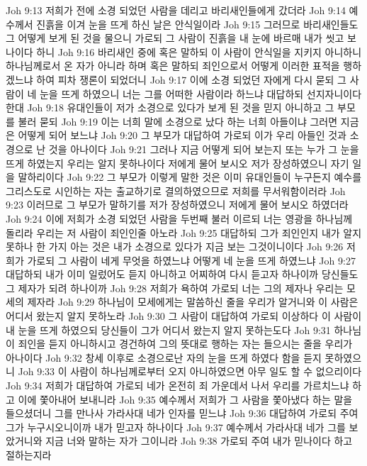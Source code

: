 Joh 9:13  저희가 전에 소경 되었던 사람을 데리고 바리새인들에게 갔더라
Joh 9:14  예수께서 진흙을 이겨 눈을 뜨게 하신 날은 안식일이라
Joh 9:15  그러므로 바리새인들도 그 어떻게 보게 된 것을 물으니 가로되 그 사람이 진흙을 내 눈에 바르매 내가 씻고 보나이다 하니
Joh 9:16  바리새인 중에 혹은 말하되 이 사람이 안식일을 지키지 아니하니 하나님께로서 온 자가 아니라 하며 혹은 말하되 죄인으로서 어떻게 이러한 표적을 행하겠느냐 하여 피차 쟁론이 되었더니
Joh 9:17  이에 소경 되었던 자에게 다시 묻되 그 사람이 네 눈을 뜨게 하였으니 너는 그를 어떠한 사람이라 하느냐 대답하되 선지자니이다 한대
Joh 9:18  유대인들이 저가 소경으로 있다가 보게 된 것을 믿지 아니하고 그 부모를 불러 묻되
Joh 9:19  이는 너희 말에 소경으로 났다 하는 너희 아들이냐 그러면 지금은 어떻게 되어 보느냐
Joh 9:20  그 부모가 대답하여 가로되 이가 우리 아들인 것과 소경으로 난 것을 아나이다
Joh 9:21  그러나 지금 어떻게 되어 보는지 또는 누가 그 눈을 뜨게 하였는지 우리는 알지 못하나이다 저에게 물어 보시오 저가 장성하였으니 자기 일을 말하리이다
Joh 9:22  그 부모가 이렇게 말한 것은 이미 유대인들이 누구든지 예수를 그리스도로 시인하는 자는 출교하기로 결의하였으므로 저희를 무서워함이러라
Joh 9:23  이러므로 그 부모가 말하기를 저가 장성하였으니 저에게 물어 보시오 하였더라
Joh 9:24  이에 저희가 소경 되었던 사람을 두번째 불러 이르되 너는 영광을 하나님께 돌리라 우리는 저 사람이 죄인인줄 아노라
Joh 9:25  대답하되 그가 죄인인지 내가 알지 못하나 한 가지 아는 것은 내가 소경으로 있다가 지금 보는 그것이니이다
Joh 9:26  저희가 가로되 그 사람이 네게 무엇을 하였느냐 어떻게 네 눈을 뜨게 하였느냐
Joh 9:27  대답하되 내가 이미 일렀어도 듣지 아니하고 어찌하여 다시 듣고자 하나이까 당신들도 그 제자가 되려 하나이까
Joh 9:28  저희가 욕하여 가로되 너는 그의 제자나 우리는 모세의 제자라
Joh 9:29  하나님이 모세에게는 말씀하신 줄을 우리가 알거니와 이 사람은 어디서 왔는지 알지 못하노라
Joh 9:30  그 사람이 대답하여 가로되 이상하다 이 사람이 내 눈을 뜨게 하였으되 당신들이 그가 어디서 왔는지 알지 못하는도다
Joh 9:31  하나님이 죄인을 듣지 아니하시고 경건하여 그의 뜻대로 행하는 자는 들으시는 줄을 우리가 아나이다
Joh 9:32  창세 이후로 소경으로난 자의 눈을 뜨게 하였다 함을 듣지 못하였으니
Joh 9:33  이 사람이 하나님께로부터 오지 아니하였으면 아무 일도 할 수 없으리이다
Joh 9:34  저희가 대답하여 가로되 네가 온전히 죄 가운데서 나서 우리를 가르치느냐 하고 이에 쫓아내어 보내니라
Joh 9:35  예수께서 저희가 그 사람을 쫓아냈다 하는 말을 들으셨더니 그를 만나사 가라사대 네가 인자를 믿느냐
Joh 9:36  대답하여 가로되 주여 그가 누구시오니이까 내가 믿고자 하나이다
Joh 9:37  예수께서 가라사대 네가 그를 보았거니와 지금 너와 말하는 자가 그이니라
Joh 9:38  가로되 주여 내가 믿나이다 하고 절하는지라
